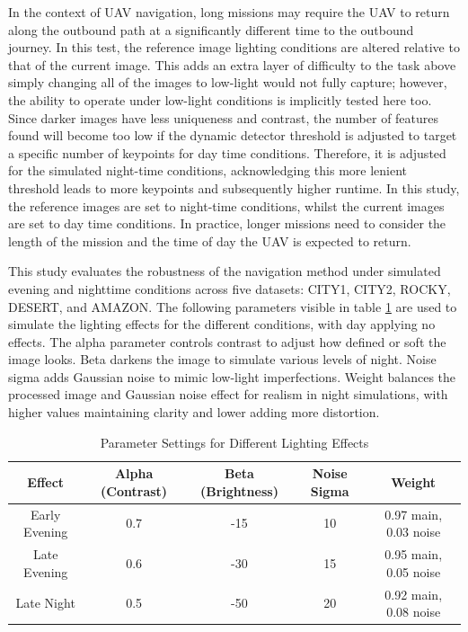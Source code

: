 In the context of UAV navigation, long missions may require the UAV to return along the outbound path at a significantly different time to the outbound journey. In this test, the reference image lighting conditions are altered relative to that of the current image. This adds an extra layer of difficulty to the task above simply changing all of the images to low-light would not fully capture; however, the ability to operate under low-light conditions is implicitly tested here too. Since darker images have less uniqueness and contrast, the number of features found will become too low if the dynamic detector threshold is adjusted to target a specific number of keypoints for day time conditions. Therefore, it is adjusted for the simulated night-time conditions, acknowledging this more lenient threshold leads to more keypoints and subsequently higher runtime. In this study, the reference images are set to night-time conditions, whilst the current images are set to day time conditions. In practice, longer missions need to consider the length of the mission and the time of day the UAV is expected to return. 

This study evaluates the robustness of the navigation method under simulated evening and nighttime conditions across five datasets: CITY1, CITY2, ROCKY, DESERT, and AMAZON. The following parameters visible in table \ref{tab:lighting_params} are used to simulate the lighting effects for the different conditions, with day applying no effects. The alpha parameter controls contrast to adjust how defined or soft the image looks. Beta darkens the image to simulate various levels of night. Noise sigma adds Gaussian noise to mimic low-light imperfections. Weight balances the processed image and Gaussian noise effect for realism in night simulations, with higher values maintaining clarity and lower adding more distortion. 


    \begin{table}[H]
        \centering
        \begin{tabular}{|c|c|c|c|c|}
        \hline
        \textbf{Effect} & \textbf{Alpha (Contrast)} & \textbf{Beta (Brightness)} & \textbf{Noise Sigma} & \textbf{Weight} \\
        \hline
        Early Evening & 0.7 & -15 & 10 & 0.97 main, 0.03 noise \\
        Late Evening & 0.6 & -30 & 15 & 0.95 main, 0.05 noise \\
        Late Night & 0.5 & -50 & 20 & 0.92 main, 0.08 noise \\
        \hline
        \end{tabular}
        \caption{Parameter Settings for Different Lighting Effects}
        \label{tab:lighting_params}
    \end{table}
    
